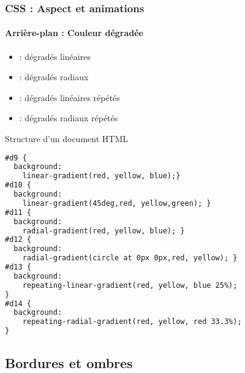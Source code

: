 \documentclass[xcolor=table]{beamer}
\begin{document}
\begin{frame}[fragile]
\frametitle{CSS : Aspect et animations}
\framesubtitle{Arrière-plan : Couleur dégradée}

\begin{minipage}{0.45\textwidth}
	\begin{itemize}
		\item {} : dégradés linéaires 
		\item {} : dégradés radiaux
		\item {} : dégradés linéaires répétés
		\item {} : dégradés radiaux répétés
	\end{itemize}
\end{minipage}
%
\begin{minipage}{0.54\textwidth}
\begin{exampleblock}{Structure d'un document HTML}
\lstset{escapeinside=**}
\tiny\bfseries
\begin{lstlisting}[language={html}]
#d9 {
  background: 
    linear-gradient(red, yellow, blue);}
#d10 {
  background: 
    linear-gradient(45deg,red, yellow,green); }
#d11 {
  background: 
    radial-gradient(red, yellow, blue); }
#d12 {
  background: 
    radial-gradient(circle at 0px 0px,red, yellow); }
#d13 {
  background: 
    repeating-linear-gradient(red, yellow, blue 25%); 
}
#d14 {
  background: 
    repeating-radial-gradient(red, yellow, red 33.3%); 
}
\end{lstlisting}
\end{exampleblock}
\end{minipage}
\end{frame}

\subsection{Bordures et ombres}
\end{document}
